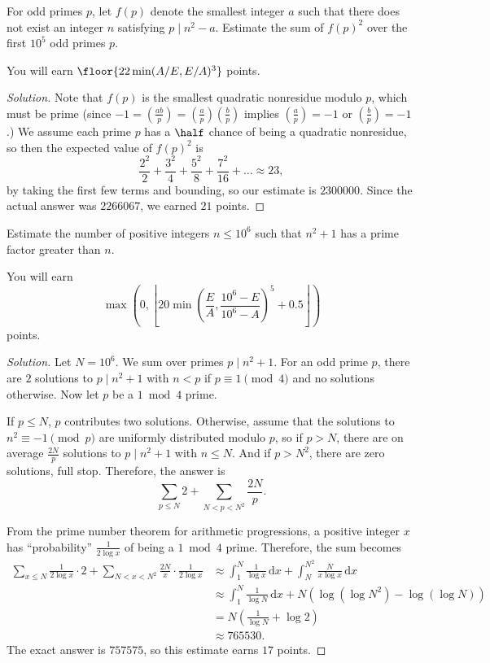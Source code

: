 \documentclass[11pt]{scrartcl}
\renewenvironment{solution}{\renewcommand\qedsymbol{$\blacksquare$}\begin{proof}[Solution]}{\end{proof}}
\begin{document}
\begin{example}
	For odd primes $p$, let $f(p)$ denote the smallest integer $a$ such that there does not exist an integer $n$ satisfying $p \mid n^2 - a$. Estimate the sum of $f(p)^2$ over the first $10^5$ odd primes $p$.

	You will earn $\floor{22\min(A/E,E/A)^3}$ points.
\end{example}

\begin{solution}
	Note that $f(p)$ is the smallest quadratic nonresidue modulo $p$, which must be prime (since $-1 = (\frac{ab}{p}) = (\frac ap)(\frac bp)$ implies $(\frac ap) = -1$ or $(\frac bp) = -1$.) We assume each prime $p$ has a $\half$ chance of being a quadratic nonresidue, so then the expected value of $f(p)^2$ is
	\[\frac{2^2}2 + \frac{3^2}4 + \frac{5^2}8 + \frac{7^2}{16} + \dots \approx 23,\]
	by taking the first few terms and bounding, so our estimate is $2300000$. Since the actual answer was $2266067$, we earned $21$ points.
\end{solution}

\begin{example}
	Estimate the number of positive integers $n \le 10^6$
	such that $n^2 + 1$ has a prime factor greater than $n$.

	You will earn
	\[\max\left(0,\left\lfloor 20\min\left(\frac EA,
	\frac{10^6 - E}{10^6 - A}\right)^5 + 0.5\right\rfloor\right)\]
	points.
\end{example}

\begin{solution}
	Let $N = 10^6$. We sum over primes $p \mid n^2 + 1$. For an odd prime $p$, there are $2$ solutions to $p \mid n^2 + 1$ with $n < p$ if $p \equiv 1 \pmod 4$ and no solutions otherwise. Now let $p$ be a $1 \bmod 4$ prime.

	If $p \le N$, $p$ contributes two solutions. Otherwise, assume that the solutions to $n^2 \equiv -1 \pmod p$ are uniformly distributed modulo $p$, so if $p > N$, there are on average $\frac{2N}p$ solutions to $p \mid n^2 + 1$ with $n \le N$. And if $p > N^2$, there are zero solutions, full stop. Therefore, the answer is
	\[\sum_{p \le N}2 + \sum_{N < p < N^2}\frac{2N}p.\]

	From the prime number theorem for arithmetic progressions, a positive integer $x$ has ``probability'' $\frac1{2\log x}$ of being a $1 \bmod 4$ prime. Therefore, the sum becomes
	\begin{align*}
		\sum_{x \le N}\frac1{2\log x} \cdot 2 + \sum_{N < x < N^2}\frac {2N}x \cdot \frac1{2\log x}
		&\approx \int_1^N\frac1{\log x} \, \mathrm dx + \int_N^{N^2}\frac N{x\log x} \, \mathrm dx \\
		&\approx \int_1^N\frac1{\log N} \, \mathrm dx + N(\log(\log N^2) - \log(\log N)) \\
		&= N\left( \frac1{\log N} + \log 2 \right) \\
		&\approx 765530.
	\end{align*}
	The exact answer is $757575$, so this estimate earns $17$ points.
\end{solution}
\end{document}
